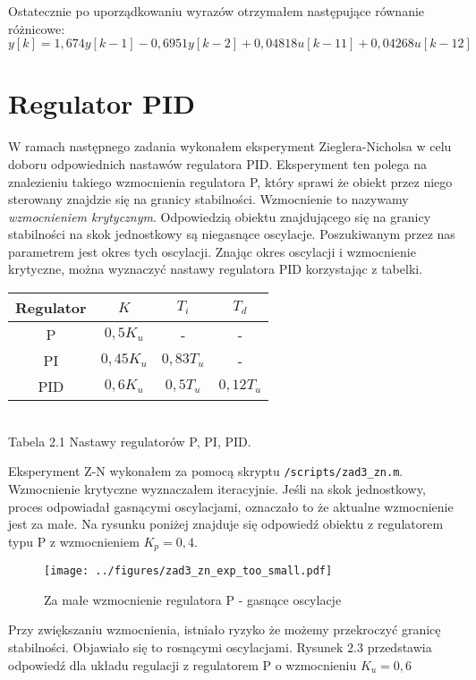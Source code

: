 \documentclass[a4paper,titlepage,11pt,floatssmall]{mwrep}
\begin{document}
Ostatecznie po uporządkowaniu wyrazów otrzymałem następujące równanie różnicowe:
\begin{equation*}
y[k] = 1,674y[k-1] - 0,6951y[k-2] + 0,04818u[k-11] + 0,04268u[k-12]  
\end{equation*}

\newpage

\section{Regulator PID}
W ramach następnego zadania wykonałem eksperyment Zieglera-Nicholsa w celu doboru odpowiednich nastawów regulatora PID. Eksperyment ten polega na znalezieniu takiego wzmocnienia regulatora P, który sprawi że obiekt przez niego sterowany znajdzie się na granicy stabilności. Wzmocnienie to nazywamy \emph{wzmocnieniem krytycznym}. Odpowiedzią obiektu znajdującego się na granicy stabilności na skok jednostkowy są niegasnące oscylacje. Poszukiwanym przez nas parametrem jest okres tych oscylacji. Znając okres oscylacji i wzmocnienie krytyczne, można wyznaczyć nastawy regulatora PID korzystając z tabelki.
\medskip
\begin{center}
\begin{tabular}{|c|c|c|c|} \hline
Regulator & $K$ & $T_i$ & $T_d$ \\
\hline \hline
P & $0,5K_u$ & - & -\\
\hline
PI & $0,45K_u$ & $0,83T_u$ & - \\
\hline
PID & $0,6K_u$ & $0,5T_u$ & $0,12T_u$ \\
\hline 
\end{tabular}\\
\medskip	
Tabela 2.1 Nastawy regulatorów P, PI, PID.
\end{center}
\bigskip
Eksperyment Z-N wykonałem za pomocą skryptu \texttt{/scripts/zad3\_{}zn.m}. 
Wzmocnienie krytyczne wyznaczałem iteracyjnie. Jeśli na skok jednostkowy, proces odpowiadał gasnącymi oscylacjami, oznaczało to że aktualne wzmocnienie jest za małe. Na rysunku poniżej znajduje się odpowiedź obiektu z regulatorem typu P z wzmocnieniem $K_p = 0,4$.

\begin{figure}[H]
\centering
\texttt{[image: ../figures/zad3\_zn\_exp\_too\_small.pdf]}
\caption{Za małe wzmocnienie regulatora P - gasnące oscylacje}
\end{figure}

\newpage
Przy zwiększaniu wzmocnienia, istniało ryzyko że możemy przekroczyć granicę stabilności. Objawiało się to rosnącymi oscylacjami. Rysunek 2.3 przedstawia odpowiedź dla układu regulacji z regulatorem P o wzmocnieniu $K_u = 0,6$
\end{document}
